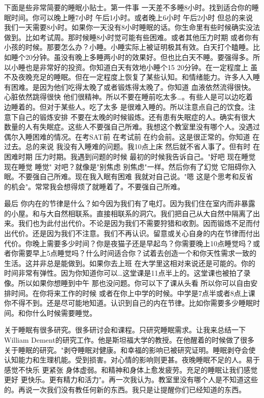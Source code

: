 下面是些非常简要的睡眠小贴士。第一件事 一天差不多睡8小时。找到适合你的睡眠时间。你可以晚上睡7小时 午后1小时。或者晚上6小时 午后2小时 但总的来说 我们一天需要8小时。如果你一天没有8小时睡眠的话。你生命里有些时候确实没法做到。比如考试周。那时候睡8小时觉可能有些困难。或者其他压力时期 或者你有小孩的时候。那要怎么办？小睡。小睡实际上被证明极其有效。白天打个瞌睡。比如睡个20分钟。虽没有晚上多睡两小时的效果好。但也比白天不睡。要强得多。所以小睡也是非常好的投资。你知道白天有效地小睡个15 20分钟。在一定程度上 虽不及夜晚充足的睡眠。但在一定程度上恢复了某些认知。和情绪能力。许多人入睡有困难。是因为他们吃得太晚了或者锻炼得太晚了。你知道 血液依然流得很快。心脏依然跳得很快 他们很精神。所以不要在睡前吃太多…。有些人是可以边吃着边睡着的。但对于某些人。吃了太多 是很难入睡的。所以注意点自己的饮食。注意下自己的锻炼安排 不要在太晚的时候锻炼。还有患有失眠症的人。确实有很大数量的人有失眠症。这些人不要强自己所难。我想这个教室里没有哪个人。没遇过偶尔入睡困难的情况。在考SAT前 在考试前 在约会前。这是很正常的。你知道 在过去。总的来说 我没有入睡难的问题。我10点上床 然后就不省人事了。但有时 在困难时期 压力时期。我遇到问题的时候 最初的时候我告诉自己。"好吧 现在睡觉 现在睡觉 睡觉" 对吧？就像是"别焦虑 别焦虑"一样。然后你有了幻觉 它阻碍你入眠。不要强自己所难。现在我入眠有困难 我就对自己说。"嗯 这是个思考和反省的机会"。常常我会想得烦了就睡着了。不要强自己所难。 

最后 你内在的节律是什么？如今因为我们有了电灯。因为我们住在室内而非暴露的小屋。和与大自然相联系。直接相联系的洞穴。我们把自己从大自然中隔离了出来。我们也为此付出代价。不论是因为我们不需要狩猎和收割。因而锻炼不足而付出代价。还是因为我们不注意。我们不再认识。留意或关心自身的内在节律而付出代价。你晚上需要多少时间？你是夜猫子还是早起鸟？你需要晚上10点睡觉吗？或者你需要早上5点睡觉吗？什么时间适合你？试着去创造一个和你天性需求一致的生活。这并非总是能做到。如果你去上班 在大学里这相对来说还是可能的。你的时间非常有弹性。因为你知道你可以…这堂课是11点半上的。这堂课也被拍了录像。所以如果你想睡到中午 那也没问题。你可以下了课从头看 所以你可以自由安排时间。在你将来工作的时候 或者在你上中学的时候。中学是7点半或者8点上课 你不得不到。还是尽可能地知道。认识到自己的内在节律。比如你需要多少睡眠时间。和你什么时候需要睡觉。 

关于睡眠有很多研究。很多研讨会和课程。只研究睡眠需求。让我来总结一下William Dement的研究工作。他是斯坦福大学的教授。在他醒着的时候做了很多关于睡眠的研究。"剥夺睡眠对健康。和幸福的影响已被研究证明。睡眠剥夺会使认知能力和生理机能。受到损害。对心情的影响则更甚。夜晚睡眠不足的人。易于感觉不快乐 更紧张 身体虚弱。和精神和身体上愈发疲劳。充足的睡眠让我们感觉更好 更快乐。更有精力和活力"。再一次我认为。教室里没有哪个人是不知道这些的。再说一次我们没有教任何新的东西。我只是让提醒你们已经知道的东西。 

